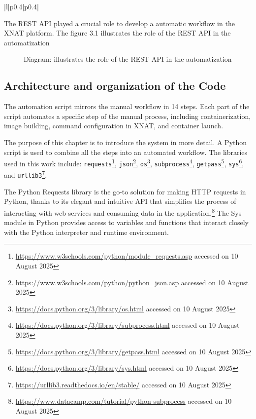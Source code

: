 \begin{longtable}{|l|p{0.4\textwidth}|p{0.4\textwidth}|}
\end{longtable}
The REST API played a crucial role to develop a automatic workflow in the XNAT platform. The figure 3.1 illustrates the role of the REST API in the automatization


\begin{figure}[H]
    \centering
    \def\svgwidth{0.9\linewidth}
    
    \caption{Diagram: illustrates the role of the REST API in the automatization}
    \label{fig:workflow-steps}
\end{figure}

\subsection{Architecture and organization of the Code}
The automation script mirrors the manual workflow in 14 steps. Each part of the script automates a specific step of the manual process, including containerization, image building, command configuration in XNAT, and container launch.

The purpose of this chapter is to introduce the system in more detail. A Python script is used to combine all the steps into an automated workflow. The libraries used in this work include: \texttt{requests}\footnote{\url{https://www.w3schools.com/python/module_requests.asp} accessed on 10 August 2025}, \texttt{json}\footnote{\url{https://www.w3schools.com/python/python_json.asp} accessed on 10 August 2025}, \texttt{os}\footnote{\url{https://docs.python.org/3/library/os.html} accessed on 10 August 2025}, \texttt{subprocess}\footnote{\url{https://docs.python.org/3/library/subprocess.html} accessed on 10 August 2025}, \texttt{getpass}\footnote{\url{https://docs.python.org/3/library/getpass.html} accessed on 10 August 2025}, \texttt{sys}\footnote{\url{https://docs.python.org/3/library/sys.html} accessed on 10 August 2025}, and \texttt{urllib3}\footnote{\url{https://urllib3.readthedocs.io/en/stable/} accessed on 10 August 2025}.

The Python Requests library is the go-to solution for making \ac{HTTP} requests in Python, thanks to its elegant and intuitive API that simplifies the process of interacting with web services and consuming data in the application.\footnote{\url{https://www.datacamp.com/tutorial/python-subprocess} accessed on 10 August 2025} The Sys module in Python provides access to variables and functions that interact closely with the Python interpreter and runtime environment.

